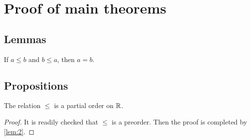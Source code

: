 
\chapter{Proof of main theorems} \label{chp:proof}

\section{Lemmas}

\begin{lemma} \label{lem:2}
	If $ a \leq b $ and $ b \leq a $, then $ a = b $.
\end{lemma}

\section{Propositions}

\begin{proposition}\label{prop:1}
	The relation $ \leq $ is a partial order on $ \mathbb{R} $.
\end{proposition}

\begin{proof}
	It is readily checked that $ \leq $ is a preorder. Then the proof is completed by \autoref{lem:2}.
\end{proof}